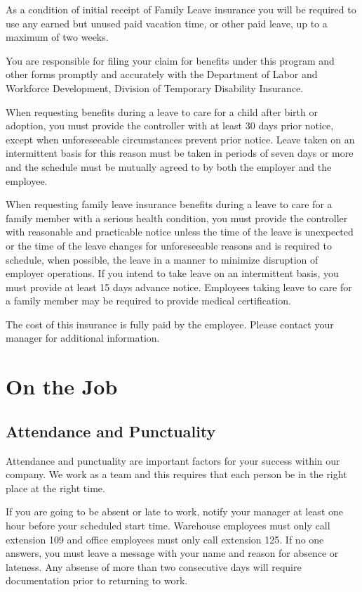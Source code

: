 \documentclass{book}
\begin{document}
As a condition of initial receipt of Family Leave insurance you will be required to use any earned but unused paid vacation time, or other paid leave, up to a maximum of two weeks.

You are responsible for filing your claim for benefits under this program and other forms promptly and accurately with the Department of Labor and Workforce Development, Division of Temporary Disability Insurance.

When requesting benefits during a leave to care for a child after birth or adoption, you must provide the controller with at least 30 days prior notice, except when unforeseeable circumstances prevent prior notice. Leave taken on an intermittent basis for this reason must be taken in periods of seven days or more and the schedule must be mutually agreed to by both the employer and the employee.

When requesting family leave insurance benefits during a leave to care for a family member with a serious health condition, you must provide the controller with reasonable and practicable notice unless the time of the leave is unexpected or the time of the leave changes for unforeseeable reasons and is required to schedule, when possible, the leave in a manner to minimize disruption of employer operations. If you intend to take leave on an intermittent basis, you must provide at least 15 days advance notice. Employees taking leave to care for a family member may be required to provide medical certification.

The cost of this insurance is fully paid by the employee. Please contact your manager for additional information.

\section{On the Job}

\subsection{Attendance and Punctuality}

Attendance and punctuality are important factors for your success within our company. We work as a team and this requires that each person be in the right place at the right time.

If you are going to be absent or late to work, notify your manager at least one hour before your scheduled start time. Warehouse employees must only call extension 109 and office employees must only call extension 125. If no one answers, you must leave a message with your name and reason for absence or lateness. Any absense of more than two consecutive days will require documentation prior to returning to work.
\end{document}
